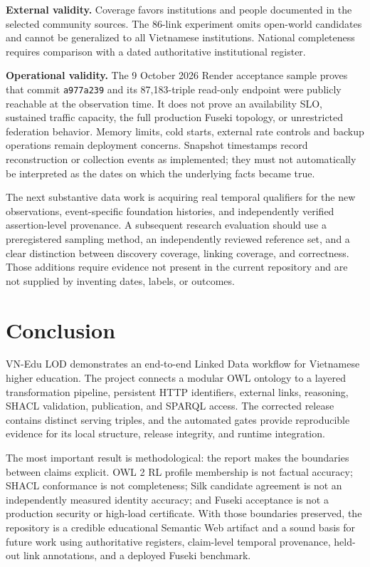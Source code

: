 \documentclass[11pt,a4paper]{article}
\newcommand{\term}[1]{\texttt{#1}}
\begin{document}
\textbf{External validity.} Coverage favors institutions and people documented in the
selected community sources. The 86-link experiment omits open-world candidates and cannot
be generalized to all Vietnamese institutions. National completeness requires comparison
with a dated authoritative institutional register.

\textbf{Operational validity.} The 9 October 2026 Render acceptance sample proves that
commit \term{a977a239} and its 87,183-triple read-only endpoint were publicly reachable at
the observation time. It does not prove an availability SLO, sustained traffic capacity,
the full production Fuseki topology, or unrestricted federation behavior. Memory limits,
cold starts, external rate controls and backup operations remain deployment concerns.
Snapshot timestamps record reconstruction or collection events as implemented; they must
not automatically be interpreted as the dates on which the underlying facts became true.

The next substantive data work is acquiring real temporal qualifiers for the new observations,
event-specific foundation histories, and independently verified assertion-level provenance. A subsequent research evaluation should use a preregistered sampling method,
an independently reviewed reference set, and a clear distinction between discovery
coverage, linking coverage, and correctness. Those additions require evidence not present
in the current repository and are not supplied by inventing dates, labels, or outcomes.

\section{Conclusion}
VN-Edu LOD demonstrates an end-to-end Linked Data workflow for Vietnamese higher education.
The project connects a modular OWL ontology to a layered transformation pipeline, persistent
HTTP identifiers, external links, reasoning, SHACL validation, publication, and SPARQL access.
The corrected release contains \metricUnionTriples{} distinct serving triples, and the
automated gates provide reproducible evidence for its local structure, release integrity,
and runtime integration.

The most important result is methodological: the report makes the boundaries between claims
explicit. OWL 2 RL profile membership is not factual accuracy; SHACL conformance is not
completeness; Silk candidate agreement is not an independently measured identity accuracy;
and Fuseki acceptance is not a production security or high-load certificate. With those
boundaries preserved, the repository is a credible educational Semantic Web artifact and a
sound basis for future work using authoritative registers, claim-level temporal provenance,
held-out link annotations, and a deployed Fuseki benchmark.
\end{document}
